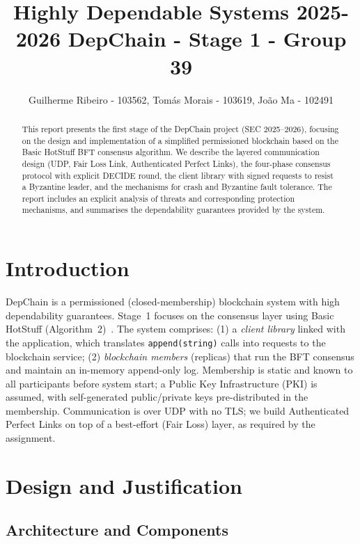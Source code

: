\documentclass{llncs}
\title{Highly Dependable Systems 2025-2026
DepChain - Stage 1 - Group 39}
\author{Guilherme Ribeiro - 103562, Tomás Morais - 103619, João Ma - 102491}
\institute{Instituto Superior Técnico, University of Lisbon, Portugal}
\begin{document}
\maketitle
\vspace{-0.8em}
\begin{abstract}
This report presents the first stage of the DepChain project (SEC 2025--2026), focusing on the design and implementation of a simplified permissioned blockchain based on the Basic HotStuff BFT consensus algorithm. We describe the layered communication design (UDP, Fair Loss Link, Authenticated Perfect Links), the four-phase consensus protocol with explicit DECIDE round, the client library with signed requests to resist a Byzantine leader, and the mechanisms for crash and Byzantine fault tolerance. The report includes an explicit analysis of threats and corresponding protection mechanisms, and summarises the dependability guarantees provided by the system.
\end{abstract}
\vspace{-0.5em}
\section{Introduction}

DepChain is a permissioned (closed-membership) blockchain system with high dependability guarantees. Stage~1 focuses on the consensus layer using Basic HotStuff (Algorithm~2)~\cite{hotstuff}. The system comprises: (1) a \emph{client library} linked with the application, which translates \texttt{append(string)} calls into requests to the blockchain service; (2) \emph{blockchain members} (replicas) that run the BFT consensus and maintain an in-memory append-only log. Membership is static and known to all participants before system start; a Public Key Infrastructure (PKI) is assumed, with self-generated public/private keys pre-distributed in the membership. Communication is over UDP with no TLS; we build Authenticated Perfect Links on top of a best-effort (Fair Loss) layer, as required by the assignment.

\section{Design and Justification}
\vspace{-0.6em}
\subsection{Architecture and Components}
\end{document}
